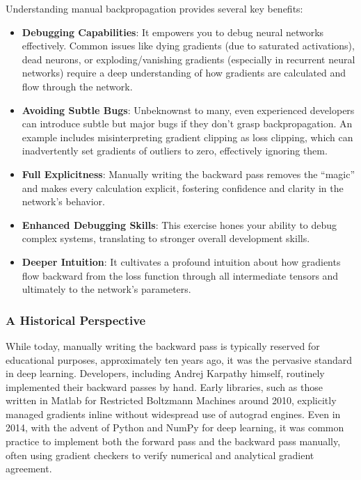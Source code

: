 Understanding manual backpropagation provides several key benefits:
\begin{itemize}
    \item \textbf{Debugging Capabilities}: It empowers you to debug neural networks effectively. Common issues like dying gradients (due to saturated activations), dead neurons, or exploding/vanishing gradients (especially in recurrent neural networks) require a deep understanding of how gradients are calculated and flow through the network.
    \item \textbf{Avoiding Subtle Bugs}: Unbeknownst to many, even experienced developers can introduce subtle but major bugs if they don't grasp backpropagation. An example includes misinterpreting gradient clipping as loss clipping, which can inadvertently set gradients of outliers to zero, effectively ignoring them.
    \item \textbf{Full Explicitness}: Manually writing the backward pass removes the ``magic'' and makes every calculation explicit, fostering confidence and clarity in the network's behavior.
    \item \textbf{Enhanced Debugging Skills}: This exercise hones your ability to debug complex systems, translating to stronger overall development skills.
    \item \textbf{Deeper Intuition}: It cultivates a profound intuition about how gradients flow backward from the loss function through all intermediate tensors and ultimately to the network's parameters.
\end{itemize}

\subsubsection{A Historical Perspective}

While today, manually writing the backward pass is typically reserved for educational purposes, approximately ten years ago, it was the pervasive standard in deep learning. Developers, including Andrej Karpathy himself, routinely implemented their backward passes by hand. Early libraries, such as those written in Matlab for Restricted Boltzmann Machines around 2010, explicitly managed gradients inline without widespread use of autograd engines. Even in 2014, with the advent of Python and NumPy for deep learning, it was common practice to implement both the forward pass and the backward pass manually, often using gradient checkers to verify numerical and analytical gradient agreement.


